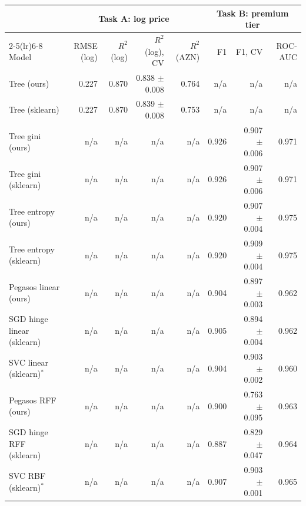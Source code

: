 \begin{tabular}{lrrrrrrr}
\toprule
 & \multicolumn{4}{c}{Task A: log price} & \multicolumn{3}{c}{Task B: premium tier} \\
\cmidrule(lr){2-5}\cmidrule(lr){6-8}
Model & RMSE (log) & $R^2$ (log) & $R^2$ (log), CV & $R^2$ (AZN) & F1 & F1, CV & ROC-AUC \\
\midrule
Tree (ours) & 0.227 & 0.870 & 0.838 $\pm$ 0.008 & 0.764 & n/a & n/a & n/a \\
Tree (sklearn) & 0.227 & 0.870 & 0.839 $\pm$ 0.008 & 0.753 & n/a & n/a & n/a \\
Tree gini (ours) & n/a & n/a & n/a & n/a & 0.926 & 0.907 $\pm$ 0.006 & 0.971 \\
Tree gini (sklearn) & n/a & n/a & n/a & n/a & 0.926 & 0.907 $\pm$ 0.006 & 0.971 \\
Tree entropy (ours) & n/a & n/a & n/a & n/a & 0.920 & 0.907 $\pm$ 0.004 & 0.975 \\
Tree entropy (sklearn) & n/a & n/a & n/a & n/a & 0.920 & 0.909 $\pm$ 0.004 & 0.975 \\
Pegasos linear (ours) & n/a & n/a & n/a & n/a & 0.904 & 0.897 $\pm$ 0.003 & 0.962 \\
SGD hinge linear (sklearn) & n/a & n/a & n/a & n/a & 0.905 & 0.894 $\pm$ 0.004 & 0.962 \\
SVC linear (sklearn)$^{*}$ & n/a & n/a & n/a & n/a & 0.904 & 0.903 $\pm$ 0.002 & 0.960 \\
Pegasos RFF (ours) & n/a & n/a & n/a & n/a & 0.900 & 0.763 $\pm$ 0.095 & 0.963 \\
SGD hinge RFF (sklearn) & n/a & n/a & n/a & n/a & 0.887 & 0.829 $\pm$ 0.047 & 0.964 \\
SVC RBF (sklearn)$^{*}$ & n/a & n/a & n/a & n/a & 0.907 & 0.903 $\pm$ 0.001 & 0.965 \\
\bottomrule
\end{tabular}
